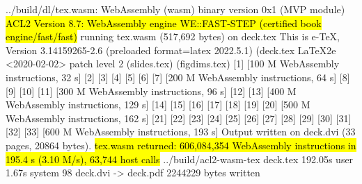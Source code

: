 \begin{slide}
\end{slide}


{\def\titleskip{12mm}
\begin{slide}[Acknowledgements]
\end{slide}}

\begin{slide}
\end{slide}

\begin{slide}
\end{slide}

\begin{slide}
\begin{term}{\codesmall\baselineskip8pt}
../build/dl/tex.wasm: WebAssembly (wasm) binary version 0x1 (MVP module)
\vskip5pt
\hl{ACL2 Version 8.7: WebAssembly engine WE::FAST-STEP (certified book engine/fast/fast)}
running tex.wasm (517,692 bytes) on deck.tex
This is e-TeX, Version 3.14159265-2.6 (preloaded format=latex 2022.5.1)
(deck.tex LaTeX2e <2020-02-02> patch level 2 (slides.tex) (figdims.tex) [1]
[100 M WebAssembly instructions, 32 s]
 [2] [3] [4] [5] [6] [7]
[200 M WebAssembly instructions, 64 s]
 [8] [9] [10] [11]
[300 M WebAssembly instructions, 96 s]
 [12] [13]
[400 M WebAssembly instructions, 129 s]
 [14] [15] [16] [17] [18] [19] [20]
[500 M WebAssembly instructions, 162 s]
 [21] [22] [23] [24] [25] [26] [27] [28] [29] [30] [31] [32] [33]
[600 M WebAssembly instructions, 193 s]
Output written on deck.dvi (33 pages, 20864 bytes).
\hl{tex.wasm returned: 606,084,354 WebAssembly instructions in 195.4 s (3.10 M/s), 63,744 host calls}
../build/acl2-wasm-tex deck.tex  192.05s user 1.67s system 98%
\vskip5pt
deck.dvi -> deck.pdf
2244229 bytes written
\end{term}
\end{slide}

